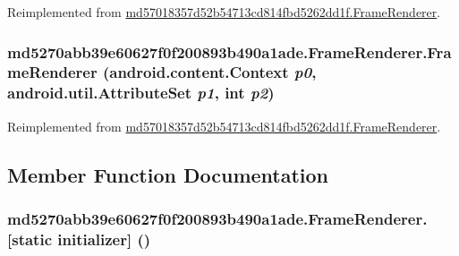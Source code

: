 Reimplemented from \hyperlink{classmd57018357d52b54713cd814fbd5262dd1f_1_1_frame_renderer_4d6af57c34847b40d0d23873adb2b744}{md57018357d52b54713cd814fbd5262dd1f.FrameRenderer}.\hypertarget{classmd5270abb39e60627f0f200893b490a1ade_1_1_frame_renderer_543d9dca2ecf03f07b3939703cdb19eb}{
\subsubsection[{FrameRenderer}]{\setlength{\rightskip}{0pt plus 5cm}md5270abb39e60627f0f200893b490a1ade.FrameRenderer.FrameRenderer (android.content.Context {\em p0}, \/  android.util.AttributeSet {\em p1}, \/  int {\em p2})}}
\label{classmd5270abb39e60627f0f200893b490a1ade_1_1_frame_renderer_543d9dca2ecf03f07b3939703cdb19eb}




Reimplemented from \hyperlink{classmd57018357d52b54713cd814fbd5262dd1f_1_1_frame_renderer_f14bbf276a028d7c7d94a1530288998c}{md57018357d52b54713cd814fbd5262dd1f.FrameRenderer}.

\subsection{Member Function Documentation}
\hypertarget{classmd5270abb39e60627f0f200893b490a1ade_1_1_frame_renderer_7c5c8e5bc02ee23d24e2a5e6ffe3392e}{
\subsubsection[{[static initializer]}]{\setlength{\rightskip}{0pt plus 5cm}md5270abb39e60627f0f200893b490a1ade.FrameRenderer.\mbox{[}static initializer\mbox{]} ()}}
\label{classmd5270abb39e60627f0f200893b490a1ade_1_1_frame_renderer_7c5c8e5bc02ee23d24e2a5e6ffe3392e}




